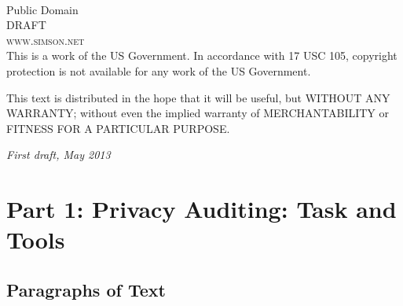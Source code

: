\documentclass[11pt,fleqn,letter]{book} %
\begin{document}
\newpage
~\vfill
\thispagestyle{empty}

\noindent Public Domain \\ %

\noindent \textsc{DRAFT}\\ %

\noindent \textsc{www.simson.net}\\ %

\noindent  This is a work of the US Government. In accordance with 17 USC 105,
 copyright protection is not available for any work of the US Government.

 This text is distributed in the hope that it will be useful, but
 WITHOUT ANY WARRANTY; without even the implied warranty of
 MERCHANTABILITY or FITNESS FOR A PARTICULAR PURPOSE.
 

\noindent \textit{First draft, May 2013} %



\pagestyle{empty} %

\tableofcontents %

\cleardoublepage %

\pagestyle{fancy} %


\chapter{Part 1: Privacy Auditing: Task and Tools}
\section{Paragraphs of Text}

\lipsum[1-7]


\end{document}

